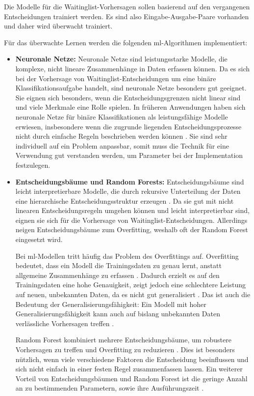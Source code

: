 Die Modelle für die Waitinglist-Vorhersagen sollen basierend auf den vergangenen Entscheidungen trainiert werden. 
Es sind also Eingabe-Ausgabe-Paare vorhanden und daher wird überwacht trainiert.

\pagebreak
Für das überwachte Lernen werden die folgenden \gls{ml}-Algorithmen implementiert:
\begin{itemize}
    \item \textbf{Neuronale Netze:}
    Neuronale Netze sind leistungsstarke Modelle, die komplexe, nicht lineare Zusammenhänge in Daten erfassen können.  
    Da es sich bei der Vorhersage von Waitinglist-Entscheidungen um eine binäre Klassifikationsaufgabe handelt, sind neuronale Netze besonders gut geeignet. Sie eignen sich besonders, wenn die Entscheidungsgrenzen nicht linear sind und viele Merkmale eine Rolle spielen.  In früheren Anwendungen haben sich neuronale Netze für binäre Klassifikationen als leistungsfähige Modelle erwiesen, insbesondere wenn die zugrunde liegenden Entscheidungsprozesse nicht durch einfache Regeln beschrieben werden können \cite{LeCun2015}. Sie sind sehr individuell auf ein Problem anpassbar, somit muss die Technik für eine Verwendung gut verstanden werden, um Parameter bei der Implementation festzulegen.
    
    \item \textbf{Entscheidungsbäume und Random Forests:}
    Entscheidungsbäume sind leicht interpretierbare Modelle, die durch rekursive Unterteilung der Daten eine hierarchische Entscheidungsstruktur erzeugen \cite{Breiman2001}.  
    Da sie gut mit nicht linearen Entscheidungsregeln umgehen können und leicht interpretierbar sind, eignen sie sich für die Vorhersage von Waitinglist-Entscheidungen. 
    Allerdings neigen Entscheidungsbäume zum Overfitting, weshalb oft der Random Forest eingesetzt wird.  

    Bei \gls{ml}-Modellen tritt häufig das Problem des Overfittings auf.  
    Overfitting bedeutet, dass ein Modell die Trainingsdaten zu genau lernt, anstatt allgemeine Zusammenhänge zu erfassen \cite{Goodfellow2016}.  
    Dadurch erzielt es auf den Trainingsdaten eine hohe Genauigkeit, zeigt jedoch eine schlechtere Leistung auf neuen, unbekannten Daten, da es nicht gut generalisiert \cite{Bishop2006}.  
    Das ist auch die Bedeutung der Generalisierungsfähigkeit: Ein Modell mit hoher Generalisierungsfähigkeit kann auch auf bislang unbekannten Daten verlässliche Vorhersagen treffen \parencite[110]{Goodfellow2016}.
    
    Random Forest kombiniert mehrere Entscheidungsbäume, um robustere Vorhersagen zu treffen und Overfitting zu reduzieren \cite{Breiman2001}.  
    Dies ist besonders nützlich, wenn viele verschiedene Faktoren die Entscheidung beeinflussen und sich nicht einfach in einer festen Regel zusammenfassen lassen.
    Ein weiterer Vorteil von Entscheidungsbäumen und Random Forest ist die geringe Anzahl an zu bestimmenden Parametern, sowie ihre Ausführungszeit \cite{probst2019hyperparameters}.


\end{itemize}

